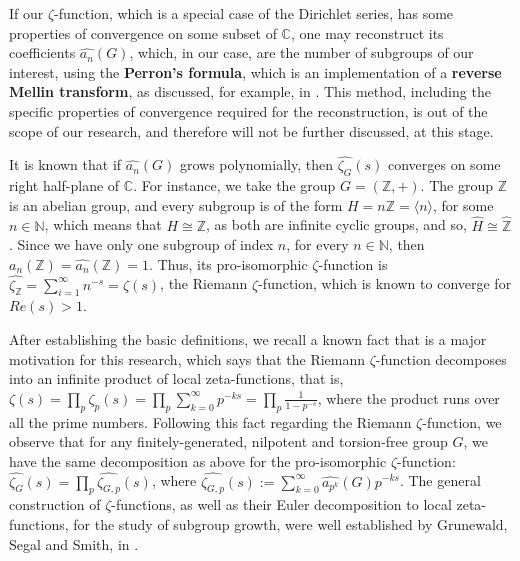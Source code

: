 \documentclass[12pt]{article}
\begin{document}
If our $\zeta$-function, which is a special case of the Dirichlet series, has some properties of convergence on some subset of $\mathbb{C}$, one may reconstruct its coefficients $\hat{a_n}(G)$, which, in our case, are the number of subgroups of our interest, using the \textbf{Perron's formula}, which is an implementation of a \textbf{reverse Mellin transform}, as discussed, for example, in \cite{MontgomeryVaughan}. This method, including the specific properties of convergence required for the reconstruction, is out of the scope of our research, and therefore will not be further discussed, at this stage.\par
It is known that if $\hat{a_n}(G)$ grows polynomially, then $\hat{\zeta_G}(s)$ converges on some right half-plane of $\mathbb{C}$. For instance, we take the group $G=(\mathbb{Z},+)$. The group $\mathbb{Z}$ is an abelian group, and every subgroup is of the form $H=n\mathbb{Z}=\langle n\rangle$, for some $n\in\mathbb{N}$, which means that $H\cong \mathbb{Z}$, as both are infinite cyclic groups, and so, $\widehat{H}\cong\widehat{\mathbb{Z}}$. Since we have only one subgroup of index $n$, for every $n\in\mathbb{N}$, then $a_n(\mathbb{Z})=\hat{a_n}(\mathbb{Z})=1$. Thus, its pro-isomorphic $\zeta$-function is $\hat{\zeta_{\mathbb{Z}}}=\sum_{i=1}^{\infty}n^{-s}=\zeta(s)$, the Riemann $\zeta$-function, which is known to converge for $Re(s)>1$.\par
After establishing the basic definitions, we recall a known fact that is a major motivation for this research, which says that the Riemann $\zeta$-function decomposes into an infinite product of local zeta-functions, that is, $\zeta(s)=\prod_p\zeta_p(s)=\prod_p\sum_{k=0}^\infty p^{-ks}=\prod_p\frac{1}{1-p^{-s}}$, where the product runs over all the prime numbers. Following this fact regarding the Riemann $\zeta$-function, we observe that for any finitely-generated, nilpotent and torsion-free group $G$, we have the same decomposition as above for the pro-isomorphic $\zeta$-function: $\hat{\zeta_G}(s)=\prod_p\hat{\zeta_{G,p}}(s)$, where $\hat{\zeta_{G,p}}(s):=\sum_{k=0}^\infty \hat{a_{p^k}}(G)p^{-ks}$. The general construction of $\zeta$-functions, as well as their Euler decomposition to local zeta-functions, for the study of subgroup growth, were well established by Grunewald, Segal and Smith, in \cite{GrunewaldSegalSmith}.
\end{document}
